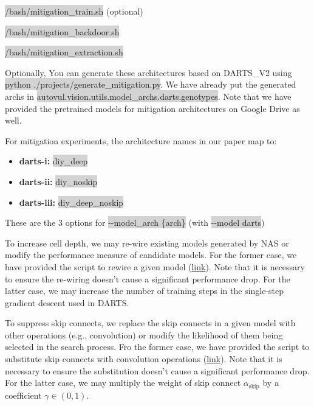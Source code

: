 \documentclass[letterpaper,twocolumn,10pt]{article}
\begin{document}
{{{{\noindent
\colorbox{lightgray}{/bash/mitigation\_train.sh} (optional)

\noindent
\colorbox{lightgray}{/bash/mitigation\_backdoor.sh}

\noindent
\colorbox{lightgray}{/bash/mitigation\_extraction.sh}

Optionally, You can generate these architectures based on DARTS\_V2 using \colorbox{lightgray}{python ./projects/generate\_mitigation.py}. We have already put the generated archs in \colorbox{lightgray}{autovul.vision.utils.model\_archs.darts.genotypes}. Note that we have provided the pretrained models for mitigation architectures on Google Drive as well.


For mitigation experiments, the architecture names in our paper map to:

{\small
\begin{itemize}
    \item {\bf darts-i: } \colorbox{lightgray}{diy\_deep}
    \item {\bf darts-ii: } \colorbox{lightgray}{diy\_noskip}
    \item {\bf darts-iii: } \colorbox{lightgray}{diy\_deep\_noskip}
\end{itemize}

These are the 3 options for \colorbox{lightgray}{-{}-model\_arch \{arch\}} (with \colorbox{lightgray}{-{}-model darts})
    
To increase cell depth, we may re-wire existing models generated by NAS or modify the performance measure of candidate models. For the former case, we have provided the script to rewire a given model (\href{https://github.com/ain-soph/autovul/blob/main/projects/generate_mitigation.py}{link}). Note that it is necessary to ensure the re-wiring doesn't cause a significant performance drop. For the latter case, we may increase the number of training steps in the single-step gradient descent used in DARTS.  

To suppress skip connects, we replace the skip connects in a given model with other operations (e.g., convolution) or modify the likelihood of them being selected in the search process. Fro the former case, we have provided the script to substitute skip connects with convolution operations (\href{https://github.com/ain-soph/autovul/blob/main/projects/generate_mitigation.py}{link}). Note that it is necessary to ensure the substitution doesn't cause a significant performance drop. For the latter case, we may multiply the weight of skip connect $\alpha_\mathrm{skip}$ by a coefficient $\gamma \in (0, 1)$.

}}}}}
\end{document}
